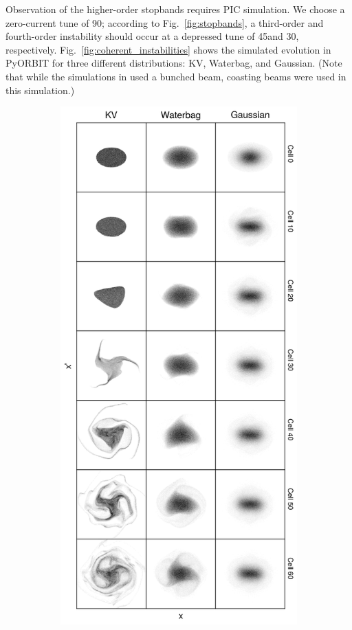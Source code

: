 Observation of the higher-order stopbands requires PIC simulation. We choose a zero-current tune of 90\degree; according to Fig.~\ref{fig:stopbands}, a third-order and fourth-order instability should occur at a depressed tune of 45\degree and 30\degree, respectively. Fig.~\ref{fig:coherent_instabilities} shows the simulated evolution in PyORBIT for three different distributions: KV, Waterbag, and Gaussian. (Note that while the simulations in \cite{Hofmann2017Book} used a bunched beam, coasting beams were used in this simulation.)
%
\begin{figure}[!p]
    \begin{subfigure}[b]{0.47\textwidth}
        \includegraphics[width=\textwidth]{Images/chapter1/coherent_instability_fourth_order.png}

\end{subfigure}
\end{figure}
